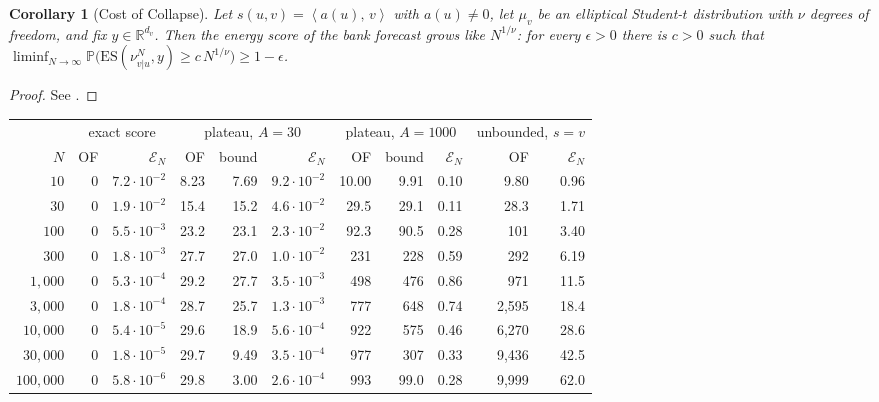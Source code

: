 \documentclass[11pt]{article}
\theoremstyle{plain}
\newtheorem{corollary}[theorem]{Corollary}
\theoremstyle{definition}
\theoremstyle{remark}
\newcommand{\RR}{\mathbb{R}}
\newcommand{\IP}[2]{\left\langle #1,\, #2 \right\rangle}
\begin{document}
\begin{corollary}[Cost of Collapse]
 \label{cor:collapsecost}
 Let $s(u,v)=\IP{a(u)}{v}$ with $a(u)\ne0$, let $\mu_v$ be an elliptical
 Student-$t$ distribution with $\nu$ degrees of freedom, and fix
 $y\in\RR^{d_v}$. Then the energy score of the bank forecast grows like
 $N^{1/\nu}$: for every $\epsilon>0$ there is $c>0$ such that
 $\liminf_{N\to\infty}\mathbb{P}\bigl(\mathrm{ES}(\nu^{N}_{v\vert u},y)\ge c\,N^{1/\nu}\bigr)\ge1-\epsilon$.
\end{corollary}
\begin{proof}
 See .
\end{proof}

\begin{table}[ht]
 \centering
 \small
 \setlength{\tabcolsep}{4pt}
 \begin{tabular}{r|rr|rrr|rrr|rr}
  \toprule
            & \multicolumn{2}{c|}{exact score} & \multicolumn{3}{c|}{plateau, $A=30$} & \multicolumn{3}{c|}{plateau, $A=1000$} & \multicolumn{2}{c}{unbounded, $s=v$} \\
  $N$       & OF & $\mathcal{E}_N$ & OF & bound & $\mathcal{E}_N$ & OF & bound & $\mathcal{E}_N$ & OF & $\mathcal{E}_N$ \\
  \midrule
  $10$ & 0 & $7.2\!\cdot\!10^{-2}$ & 8.23 & 7.69 & $9.2\!\cdot\!10^{-2}$ & 10.00 & 9.91 & 0.10 & 9.80 & 0.96 \\
  $30$ & 0 & $1.9\!\cdot\!10^{-2}$ & 15.4 & 15.2 & $4.6\!\cdot\!10^{-2}$ & 29.5 & 29.1 & 0.11 & 28.3 & 1.71 \\
  $100$ & 0 & $5.5\!\cdot\!10^{-3}$ & 23.2 & 23.1 & $2.3\!\cdot\!10^{-2}$ & 92.3 & 90.5 & 0.28 & 101 & 3.40 \\
  $300$ & 0 & $1.8\!\cdot\!10^{-3}$ & 27.7 & 27.0 & $1.0\!\cdot\!10^{-2}$ & 231 & 228 & 0.59 & 292 & 6.19 \\
  $1{,}000$ & 0 & $5.3\!\cdot\!10^{-4}$ & 29.2 & 27.7 & $3.5\!\cdot\!10^{-3}$ & 498 & 476 & 0.86 & 971 & 11.5 \\
  $3{,}000$ & 0 & $1.8\!\cdot\!10^{-4}$ & 28.7 & 25.7 & $1.3\!\cdot\!10^{-3}$ & 777 & 648 & 0.74 & 2{,}595 & 18.4 \\
  $10{,}000$ & 0 & $5.4\!\cdot\!10^{-5}$ & 29.6 & 18.9 & $5.6\!\cdot\!10^{-4}$ & 922 & 575 & 0.46 & 6{,}270 & 28.6 \\
  $30{,}000$ & 0 & $1.8\!\cdot\!10^{-5}$ & 29.7 & 9.49 & $3.5\!\cdot\!10^{-4}$ & 977 & 307 & 0.33 & 9{,}436 & 42.5 \\
  $100{,}000$ & 0 & $5.8\!\cdot\!10^{-6}$ & 29.8 & 3.00 & $2.6\!\cdot\!10^{-4}$ & 993 & 99.0 & 0.28 & 9{,}999 & 62.0 \\

\end{tabular}
\end{table}
\end{document}
